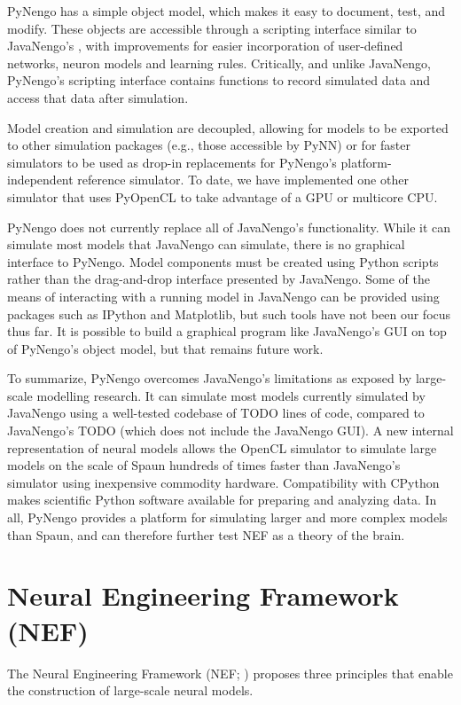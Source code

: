 \documentclass{frontiersSCNS}
\begin{document}
PyNengo has a simple object model,
which makes it easy to
document, test, and modify.
These objects are accessible
through a scripting interface
similar to JavaNengo's \cite{TODO}, %
with improvements
for easier incorporation of user-defined networks,
neuron models and learning rules.
Critically, and unlike JavaNengo,
PyNengo's scripting interface
contains functions to record simulated data
and access that data after simulation.

Model creation and simulation are decoupled,
allowing for models to be exported
to other simulation packages
(e.g., those accessible by PyNN)
or for faster simulators to be used
as drop-in replacements for PyNengo's
platform-independent reference simulator.
To date, we have implemented one other simulator
that uses PyOpenCL to take advantage
of a GPU or multicore CPU.

PyNengo does not currently
replace all of JavaNengo's functionality.
While it can simulate most
models that JavaNengo can simulate,
there is no graphical interface to PyNengo.
Model components must be created
using Python scripts rather than
the drag-and-drop interface presented by JavaNengo.
Some of the means of interacting
with a running model in JavaNengo
can be provided using packages
such as IPython and Matplotlib,
but such tools have not been our focus thus far.
It is possible to build a graphical program
like JavaNengo's GUI on top of PyNengo's object model,
but that remains future work.

To summarize, PyNengo overcomes
JavaNengo's limitations as exposed by large-scale modelling research.
It can simulate most models
currently simulated by JavaNengo
using a well-tested codebase of
TODO lines of code,
compared to JavaNengo's TODO
(which does not include the JavaNengo GUI).
A new internal representation of neural models
allows the OpenCL simulator to simulate
large models on the scale of Spaun
hundreds of times faster than JavaNengo's simulator
using inexpensive commodity hardware.
Compatibility with CPython makes scientific Python software
available for preparing and analyzing data.
In all, PyNengo provides a platform for
simulating larger and more complex models than Spaun,
and can therefore further test NEF
as a theory of the brain.

\section{Neural Engineering Framework (NEF)}

The Neural Engineering Framework (NEF; \cite{TODO})
proposes three principles
that enable the construction
of large-scale neural models.
\end{document}
